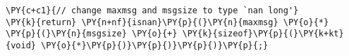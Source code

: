 \begin{Verbatim}[commandchars=\\\{\},codes={\catcode`\$=3\catcode`\^=7\catcode`\_=8}]
\PY{c+c1}{// change maxmsg and msgsize to type `nan long'}
\PY{k}{return} \PY{n+nf}{isnan}\PY{p}{(}\PY{n}{maxmsg} \PY{o}{*} \PY{p}{(}\PY{n}{msgsize} \PY{o}{+} \PY{k}{sizeof}\PY{p}{(}\PY{k+kt}{void} \PY{o}{*}\PY{p}{)}\PY{p}{)}\PY{p}{)}\PY{p}{;}
\end{Verbatim}
